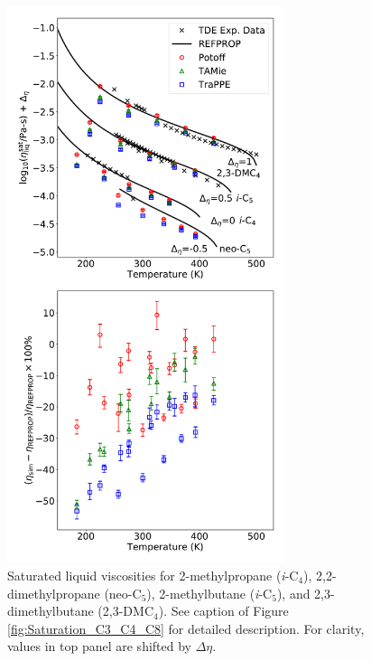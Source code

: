 \documentclass[preprint,review,12pt]{elsarticle}
\begin{document}
	\begin{figure}[htb!]
		\centering
		\includegraphics[width=3.2in]{compare_force_fields_short_branched.pdf}
		\caption{Saturated liquid viscosities for 2-methylpropane (\textit{i}-C$_{4}$), 2,2-dimethylpropane (neo-C$_{5}$), 2-methylbutane (\textit{i}-C$_{5}$), and 2,3-dimethylbutane (2,3-DMC$_4$). See caption of Figure \ref{fig:Saturation_C3_C4_C8} for detailed description. For clarity, values in top panel are shifted by $\Delta \eta$.}
		\label{fig:Saturation_short_branched}
	\end{figure} 
	
\end{document}
